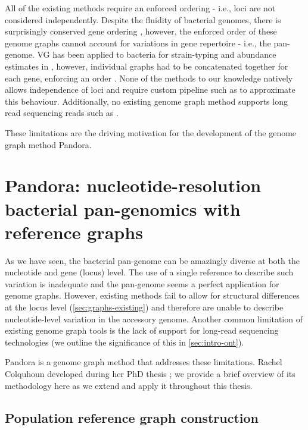 \noindent
All of the existing methods require an enforced ordering - i.e., loci are not considered independently. Despite the fluidity of bacterial genomes, there is surprisingly conserved gene ordering \cite{Tamames2001,Rocha2008}, however, the enforced order of these genome graphs cannot account for variations in gene repertoire - i.e., the pan-genome. VG has been applied to bacteria for strain-typing and abundance estimates in \ecoli{}, however, individual graphs had to be concatenated together for each gene, enforcing an order \cite{strainflair2021}. None of the methods to our knowledge natively allows independence of loci and require custom pipeline such as \cite{strainflair2021} to approximate this behaviour. Additionally, no existing genome graph method supports long read sequencing reads such as \ont{}.

These limitations are the driving motivation for the development of the genome graph method Pandora.

\section{Pandora: nucleotide-resolution bacterial pan-genomics with reference graphs}
\label{sec:pandora-intro}

As we have seen, the bacterial pan-genome can be amazingly diverse at both the nucleotide and gene (locus) level. The use of a single reference to describe such variation is inadequate and the pan-genome seems a perfect application for genome graphs. However, existing methods fail to allow for structural differences at the locus level (\autoref{sec:graphs-existing}) and therefore are unable to describe nucleotide-level variation in the accessory genome. Another common limitation of existing genome graph tools is the lack of support for long-read sequencing technologies (we outline the significance of this in \autoref{sec:intro-ont}).

Pandora is a genome graph method that addresses these limitations. Rachel Colquhoun developed \pandora{} during her PhD thesis \cite{rachelthesis}; we provide a brief overview of its methodology here as we extend and apply it throughout this thesis.

\subsection{Population reference graph construction}
\label{sec:make_prg}

